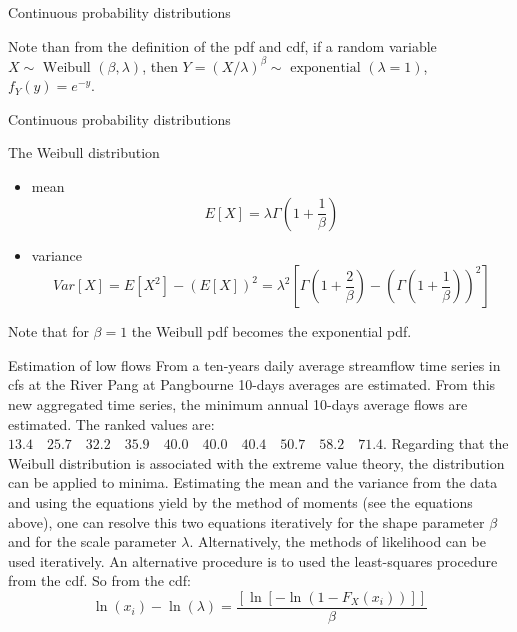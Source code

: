 \documentclass[8pt]{beamer}
\renewcommand{\emph}[1]{\textcolor{myorange}{#1}}
\begin{document}
\begin{frame}{Continuous probability distributions}
\begin{minipage}{0.49\textwidth}
\end{minipage}
Note than from the definition of the \emph{pdf} and \emph{cdf}, if a random variable $X \sim \text{ Weibull } (\beta, \lambda)$, then $Y = \left( X/\lambda \right)^{\beta} \sim \text{ exponential } (\lambda=1)$, $f_Y (y) = e^{-y}$. 
\end{frame}

\begin{frame}{Continuous probability distributions} 
    \begin{block}{The \alert{Weibull} distribution}
        \begin{itemize}
            \item \emph{mean}
                \[
                    E[X] = \lambda \Gamma \left( 1 + \frac{1}{\beta} \right)
                \]
            \item \emph{variance}
                \[
                    Var[X] = E[X^2] - \left( E[X] \right)^2 = \lambda^2 \left[ \Gamma \left(1 + \frac{2}{\beta} \right) - \left( \Gamma \left( 1 + \frac{1}{\beta} \right) \right)^2 \right]
                \]
        \end{itemize}
        Note that for $\beta=1$ the \emph{Weibull pdf} becomes the \emph{exponential pdf}.
\end{block}
 \begin{exampleblock}{Estimation of low flows} %
     From a ten-years daily average streamflow time series  in \emph{cfs} at the River Pang at Pangbourne 10-days averages are estimated. From this new aggregated time series, the minimum annual 10-days average flows are estimated. The ranked values are: $13.4 \quad 25.7 \quad 32.2 \quad 35.9 \quad 40.0 \quad 40.0 \quad 40.4 \quad 50.7 \quad 58.2 \quad 71.4$. Regarding that  the \emph{Weibull distribution} is associated with the \emph{extreme value theory}, the distribution can be applied to minima. Estimating the \emph{mean} and the \emph{variance} from the data and using the equations yield by the method of moments (see the equations above), one can resolve this two equations iteratively for the shape parameter $\beta$ and for the scale parameter $\lambda$. Alternatively, the \emph{methods of likelihood} can be used iteratively. An alternative procedure is to used the \emph{least-squares procedure} from the \emph{cdf}. So from the \emph{cdf}:
     \[
         \ln (x_i) - \ln (\lambda) = \frac{\left[\ln \left[-\ln \left(1 - F_X (x_i) \right) \right]\right]}{\beta}
     \]
    \end{exampleblock}
\end{frame}
\end{document}
